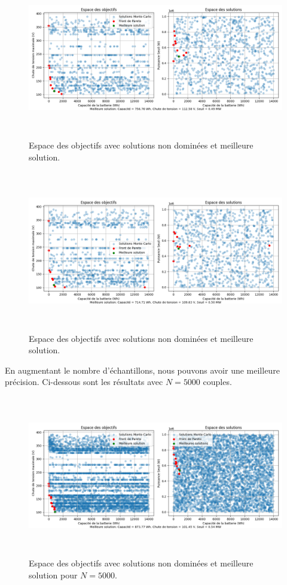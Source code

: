\documentclass[11pt, a4paper, oneside, portrait]{report}
\begin{document}
            \begin{figure}[H]
                \centering
                \includegraphics[height=7cm]{Monte-Carlo(1).png}
                \caption{Espace des objectifs avec solutions non dominées et meilleure solution.}
            \end{figure}

            \begin{figure}[H]
                \centering
                \includegraphics[height=7cm]{Monte-Carlo(2).png}
                \caption{Espace des objectifs avec solutions non dominées et meilleure solution.}
            \end{figure}

            En augmentant le nombre d'échantillons, nous pouvons avoir une meilleure précision. Ci-dessous sont les résultats avec $N = 5000$ couples.

            \begin{figure}[H]
                \centering
                \includegraphics[height=7cm]{Monte-Carlo_5000.png}
                \caption{Espace des objectifs avec solutions non dominées et meilleure solution pour $N = 5000$.}
            \end{figure}
\end{document}
